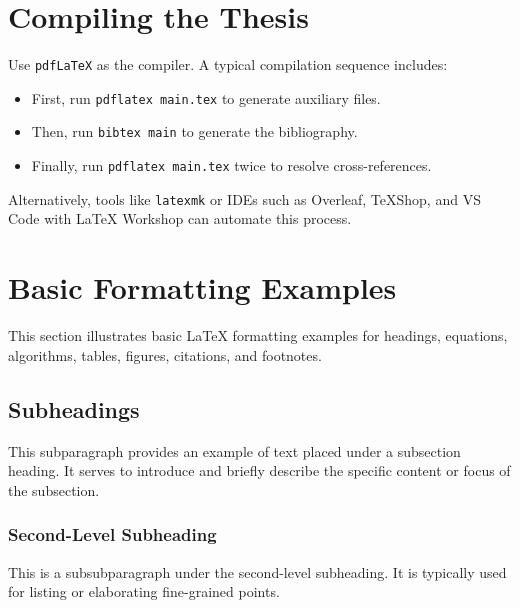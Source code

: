 \section{Compiling the Thesis}
\begin{paragraph}
Use \texttt{pdfLaTeX} as the compiler. A typical compilation sequence includes:
\begin{itemize}[leftmargin=\paritemindent]
    \item First, run \texttt{pdflatex main.tex} to generate auxiliary files.
    \item Then, run \texttt{bibtex main} to generate the bibliography.
    \item Finally, run \texttt{pdflatex main.tex} twice to resolve cross-references.
\end{itemize}

Alternatively, tools like \texttt{latexmk} or IDEs such as Overleaf, TeXShop, and VS Code with {\LaTeX} Workshop can automate this process.
\end{paragraph}

\section{Basic Formatting Examples}
\begin{paragraph}
This section illustrates basic {\LaTeX} formatting examples for headings, equations, algorithms, tables, figures, citations, and footnotes.
\end{paragraph}

\subsection{Subheadings}
\begin{subparagraph}
This subparagraph provides an example of text placed under a subsection heading. It serves to introduce and briefly describe the specific content or focus of the subsection.
\end{subparagraph}


\subsubsection{Second-Level Subheading}
\begin{subsubparagraph}
This is a subsubparagraph under the second-level subheading. It is typically used for listing or elaborating fine-grained points.
\end{subsubparagraph}

